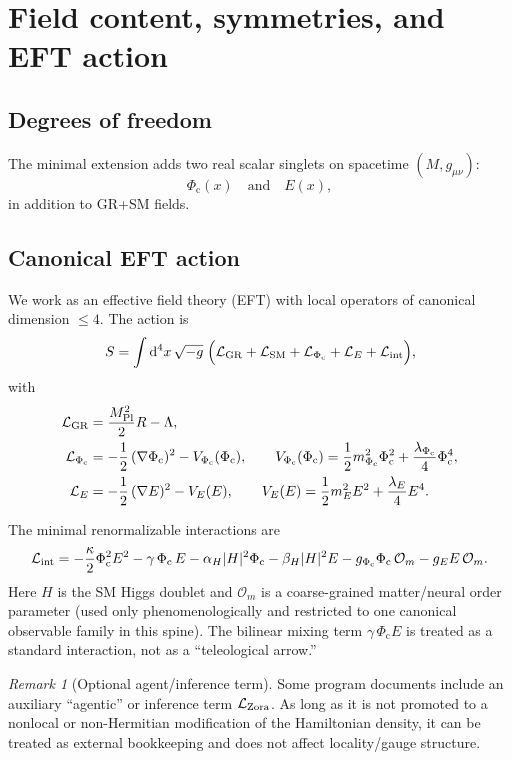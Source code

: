 \documentclass[reprint,amsmath,amssymb,aps,showkeys]{revtex4-2}
\theoremstyle{remark}
\newtheorem{remark}{Remark}
\newcommand{\dd}{\mathrm{d}}
\newcommand{\Phic}{\Phi_{\mathrm{c}}}
\newcommand{\Eth}{E}
\newcommand{\Mpl}{M_{\mathrm{Pl}}}
\newcommand{\Lag}{\mathcal{L}}
\newcommand{\cO}{\mathcal{O}}
\begin{document}
\section{Field content, symmetries, and EFT action}
\subsection{Degrees of freedom}
The minimal extension adds two real scalar singlets on spacetime $(M,g_{\mu\nu})$:
\[
\Phic(x)\quad\text{and}\quad \Eth(x),
\]
in addition to GR+SM fields.

\subsection{Canonical EFT action}
We work as an effective field theory (EFT) with local operators of canonical dimension $\le 4$.
The action is
\begin{equation}
S=\int \dd^4x\,\sqrt{-g}\;\Big(\Lag_{\rm GR}+\Lag_{\rm SM}+\Lag_{\Phic}+\Lag_{\Eth}+\Lag_{\rm int}\Big),
\label{eq:action}
\end{equation}
with
\begin{align}
\Lag_{\rm GR} &= \frac{\Mpl^2}{2}R-\Lambda,
\\
\Lag_{\Phic} &= -\frac12\,(\nabla \Phic)^2 - V_{\Phic}(\Phic), \qquad
V_{\Phic}(\Phic)=\frac12 m_{\Phic}^2 \Phic^2 + \frac{\lambda_{\Phic}}{4}\Phic^4,
\\
\Lag_{\Eth} &= -\frac12\,(\nabla \Eth)^2 - V_{\Eth}(\Eth), \qquad
V_{\Eth}(\Eth)=\frac12 m_{\Eth}^2 \Eth^2 + \frac{\lambda_{\Eth}}{4}\Eth^4.
\end{align}

The minimal renormalizable interactions are
\begin{equation}
\Lag_{\rm int}
=
-\frac{\kappa}{2}\Phic^2\Eth^2
-\gamma\,\Phic\,\Eth
-\alpha_H |H|^2 \Phic
-\beta_H |H|^2 \Eth
-g_{\Phic}\Phic\,\cO_m
-g_{\Eth}\Eth\,\cO_m.
\label{eq:int}
\end{equation}
Here $H$ is the SM Higgs doublet and $\cO_m$ is a coarse-grained matter/neural order parameter
(used only phenomenologically and restricted to one canonical observable family in this spine). The bilinear mixing term $\gamma\,\Phic\Eth$ is treated as a
standard interaction, not as a ``teleological arrow.''

\begin{remark}[Optional agent/inference term]
Some program documents include an auxiliary ``agentic'' or inference term $\Lag_{\rm Zora}$.
As long as it is not promoted to a nonlocal or non-Hermitian modification of the Hamiltonian density,
it can be treated as external bookkeeping and does not affect locality/gauge structure.
\end{remark}
\end{document}

